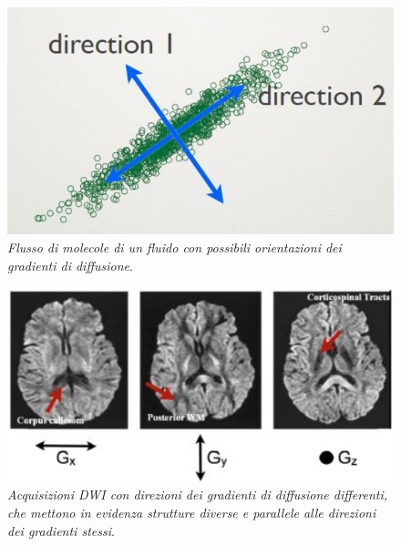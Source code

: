 \documentclass{report}
\numberwithin{equation}{section}
\numberwithin{figure}{section}
\begin{document}
\begin{figure}[htp]
\centering
\includegraphics[scale=0.6]{immagini/orie.png}
\caption{\label{fig:orie} \textit{Flusso di molecole di un fluido con possibili orientazioni dei gradienti di diffusione}.}
\end{figure}

\begin{figure}[htp]
\centering
\includegraphics[scale=1.1]{immagini/dire.png}
\caption{\label{fig:dire} \textit{Acquisizioni DWI con direzioni dei gradienti di diffusione differenti, che mettono in evidenza strutture diverse e parallele alle direzioni dei gradienti stessi}.}
\end{figure}
\end{document}
